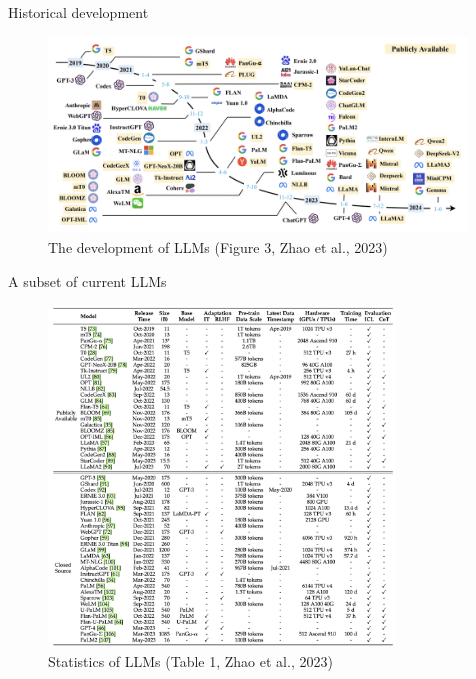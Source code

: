 \documentclass[10pt]{beamer}
\begin{document}
\begin{frame}{Historical development}

\begin{figure}[h]
\centering
\includegraphics[width=0.99\textwidth]{fig/zhao_2023_v2_fig3}
\caption{The development of LLMs (Figure 3, Zhao et al., 2023)}
\end{figure}


\end{frame}

\begin{frame}{A subset of current LLMs}

\begin{figure}[h]
\centering
\includegraphics[width=0.82\textwidth]{fig/tab1_zhao_2023}
\caption{Statistics of LLMs (Table 1, Zhao et al., 2023)}
\end{figure}

\end{frame}
\end{document}
